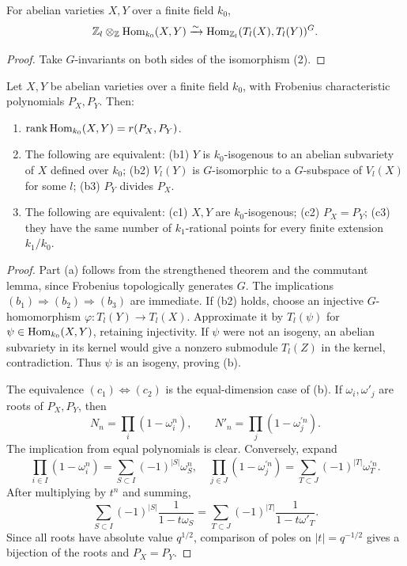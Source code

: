 \begin{theorem}
\label{mumford-thm-tate-hom-finite-field-rational}
For abelian varieties $X,Y$ over a finite field $k_0$,
\[
 \mathbb Z_l\otimes_{\mathbb Z}{\rm Hom}_{k_0}(X,Y)
 \xrightarrow{\sim}{\rm Hom}_{\mathbb Z_l}(T_l(X),T_l(Y))^G.
\]
\end{theorem}
\begin{proof}
Take $G$-invariants on both sides of the isomorphism (2).

\end{proof}


\begin{theorem}
\label{mumford-thm-tate-applications}
Let $X,Y$ be abelian varieties over a finite field $k_0$, with Frobenius
characteristic polynomials $P_X,P_Y$. Then:
\begin{enumerate}
\item $\operatorname{rank}{\rm Hom}_{k_0}(X,Y)=r(P_X,P_Y)$.
\item The following are equivalent: (b1) $Y$ is $k_0$-isogenous to an abelian
subvariety of $X$ defined over $k_0$; (b2) $V_l(Y)$ is $G$-isomorphic to a
$G$-subspace of $V_l(X)$ for some $l$; (b3) $P_Y$ divides $P_X$.
\item The following are equivalent: (c1) $X,Y$ are $k_0$-isogenous; (c2)
$P_X=P_Y$; (c3) they have the same number of $k_1$-rational points for every
finite extension $k_1/k_0$.
\end{enumerate}
\end{theorem}
\begin{proof}
Part (a) follows from the strengthened theorem and the commutant lemma, since
Frobenius topologically generates $G$. The implications
$(b_1)\Rightarrow(b_2)\Rightarrow(b_3)$ are immediate. If (b2) holds, choose
an injective $G$-homomorphism $\varphi:T_l(Y)\to T_l(X)$. Approximate it by
$T_l(\psi)$ for $\psi\in{\rm Hom}_{k_0}(X,Y)$, retaining injectivity. If
$\psi$ were not an isogeny, an abelian subvariety in its kernel would give a
nonzero submodule $T_l(Z)$ in the kernel, contradiction. Thus $\psi$ is an
isogeny, proving (b).

The equivalence $(c_1)\Leftrightarrow(c_2)$ is the equal-dimension case of
(b). If $\omega_i,\omega'_j$ are roots of $P_X,P_Y$, then
\[
 N_n=\prod_i(1-\omega_i^n),\qquad N'_n=\prod_j(1-\omega_j^{\prime n}).
\]
The implication from equal polynomials is clear. Conversely, expand
\[
 \prod_{i\in I}(1-\omega_i^n)=\sum_{S\subset I}(-1)^{|S|}\omega_S^n,
 \quad
 \prod_{j\in J}(1-\omega_j^{\prime n})=\sum_{T\subset J}(-1)^{|T|}\omega_T^{\prime n}.
\]
After multiplying by $t^n$ and summing,
\[
 \sum_{S\subset I}(-1)^{|S|}\frac1{1-t\omega_S}
 =\sum_{T\subset J}(-1)^{|T|}\frac1{1-t\omega'_T}.
\]
Since all roots have absolute value $q^{1/2}$, comparison of poles on
$|t|=q^{-1/2}$ gives a bijection of the roots and $P_X=P_Y$.

\end{proof}


